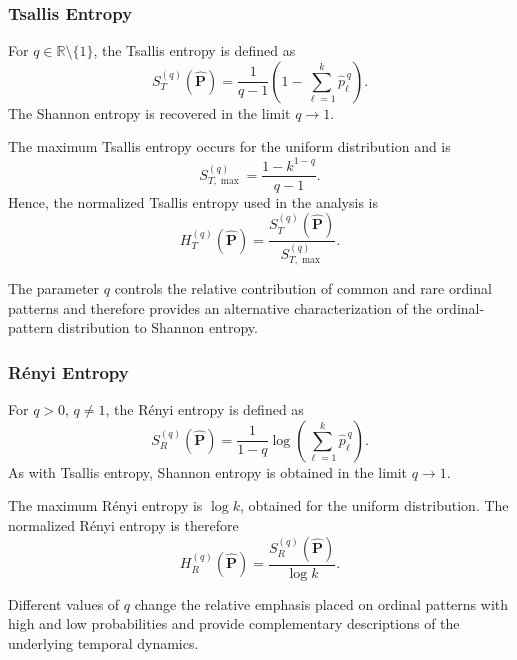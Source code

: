 \documentclass[11pt,a4paper]{article}
\begin{document}
\subsubsection{Tsallis Entropy}

For $q\in\mathbb{R}\setminus\{1\}$, the Tsallis entropy is defined as
\begin{equation}
	S_{T}^{(q)}(\widehat{\mathbf{P}})
	=
	\frac{1}{q-1}
	\left(
	1-\sum_{\ell=1}^{k}
	\widehat{p}_\ell^{\,q}
	\right).
\end{equation}
The Shannon entropy is recovered in the limit $q\rightarrow1$.

The maximum Tsallis entropy occurs for the uniform distribution and is
\begin{equation}
	S_{T,\max}^{(q)}
	=
	\frac{1-k^{1-q}}{q-1}.
\end{equation}
Hence, the normalized Tsallis entropy used in the analysis is
\begin{equation}
	H_{T}^{(q)}(\widehat{\mathbf{P}})
	=
	\frac{
		S_{T}^{(q)}(\widehat{\mathbf{P}})
	}{
		S_{T,\max}^{(q)}
	}.
\end{equation}

The parameter $q$ controls the relative contribution of common and rare ordinal patterns and therefore provides an alternative characterization of the ordinal-pattern distribution to Shannon entropy.

\subsubsection{R\'enyi Entropy}

For $q>0$, $q\neq1$, the R\'enyi entropy is defined as
\begin{equation}
	S_{R}^{(q)}(\widehat{\mathbf{P}})
	=
	\frac{1}{1-q}
	\log
	\left(
	\sum_{\ell=1}^{k}
	\widehat{p}_\ell^{\,q}
	\right).
\end{equation}
As with Tsallis entropy, Shannon entropy is obtained in the limit $q\rightarrow1$.

The maximum R\'enyi entropy is $\log k$, obtained for the uniform distribution. The normalized R\'enyi entropy is therefore
\begin{equation}
	H_{R}^{(q)}(\widehat{\mathbf{P}})
	=
	\frac{
		S_{R}^{(q)}(\widehat{\mathbf{P}})
	}{
		\log k
	}.
\end{equation}

Different values of $q$ change the relative emphasis placed on ordinal patterns with high and low probabilities and provide complementary descriptions of the underlying temporal dynamics.
\end{document}
